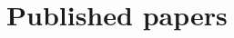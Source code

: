 \documentclass[a4paper, 12pt]{book}
\begin{document}
\chapter{Published papers}
\label{app:papers}
\cleardoublepage

\end{document}
